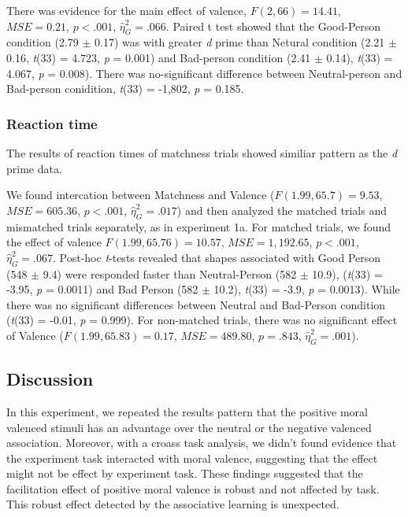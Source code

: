 \documentclass[man]{apa6}
\begin{document}
There was evidence for the main effect of valence, \(F(2, 66) = 14.41\), \(\mathit{MSE} = 0.21\), \(p < .001\), \(\hat{\eta}^2_G = .066\). Paired t test showed that the Good-Person condition (2.79 \(\pm\) 0.17) was with greater \emph{d} prime than Netural condition (2.21 \(\pm\) 0.16, \emph{t}(33) = 4.723, \emph{p} = 0.001) and Bad-person condition (2.41 \(\pm\) 0.14), \emph{t}(33) = 4.067, \emph{p} = 0.008). There was no-significant difference between Neutral-person and Bad-person conidition, \emph{t}(33) = -1,802, \emph{p} = 0.185.

\hypertarget{reaction-time-2}{%
\subsubsection{Reaction time}\label{reaction-time-2}}

The results of reaction times of matchness trials showed similiar pattern as the \emph{d} prime data.

We found intercation between Matchness and Valence (\(F(1.99, 65.7) = 9.53\), \(\mathit{MSE} = 605.36\), \(p < .001\), \(\hat{\eta}^2_G = .017\)) and then analyzed the matched trials and mismatched trials separately, as in experiment 1a. For matched trials, we found the effect of valence \(F(1.99, 65.76) = 10.57\), \(\mathit{MSE} = 1,192.65\), \(p < .001\), \(\hat{\eta}^2_G = .067\). Post-hoc \emph{t}-tests revealed that shapes associated with Good Person (548 \(\pm\) 9.4) were responded faster than Neutral-Person (582 \(\pm\) 10.9), (\emph{t}(33) = -3.95, \emph{p} = 0.0011) and Bad Person (582 \(\pm\) 10.2), \emph{t}(33) = -3.9, \emph{p} = 0.0013). While there was no significant differences between Neutral and Bad-Person condition (\emph{t}(33) = -0.01, \emph{p} = 0.999). For non-matched trials, there was no significant effect of Valence (\(F(1.99, 65.83) = 0.17\), \(\mathit{MSE} = 489.80\), \(p = .843\), \(\hat{\eta}^2_G = .001\)).

\hypertarget{discussion-2}{%
\subsection{Discussion}\label{discussion-2}}

In this experiment, we repeated the results pattern that the positive moral valenced stimuli has an advantage over the neutral or the negative valenced association. Moreover, with a croass task analysis, we didn't found evidence that the experiment task interacted with moral valence, suggesting that the effect might not be effect by experiment task.
These findings suggested that the facilitation effect of positive moral valence is robust and not affected by task. This robust effect detected by the associative learning is unexpected.
\end{document}
